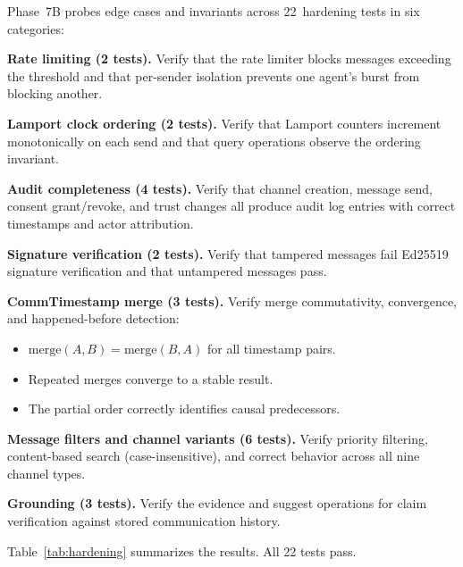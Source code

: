 \documentclass[10pt, twocolumn]{article}
\begin{document}
Phase~7B probes edge cases and invariants across 22~hardening tests in six categories:

\textbf{Rate limiting (2 tests).} Verify that the rate limiter blocks messages exceeding the threshold and that per-sender isolation prevents one agent's burst from blocking another.

\textbf{Lamport clock ordering (2 tests).} Verify that Lamport counters increment monotonically on each send and that query operations observe the ordering invariant.

\textbf{Audit completeness (4 tests).} Verify that channel creation, message send, consent grant/revoke, and trust changes all produce audit log entries with correct timestamps and actor attribution.

\textbf{Signature verification (2 tests).} Verify that tampered messages fail Ed25519 signature verification and that untampered messages pass.

\textbf{CommTimestamp merge (3 tests).} Verify merge commutativity, convergence, and happened-before detection:
\begin{itemize}[nosep, leftmargin=*]
  \item $\text{merge}(A, B) = \text{merge}(B, A)$ for all timestamp pairs.
  \item Repeated merges converge to a stable result.
  \item The partial order correctly identifies causal predecessors.
\end{itemize}

\textbf{Message filters and channel variants (6 tests).} Verify priority filtering, content-based search (case-insensitive), and correct behavior across all nine channel types.

\textbf{Grounding (3 tests).} Verify the evidence and suggest operations for claim verification against stored communication history.

Table~\ref{tab:hardening} summarizes the results. All 22 tests pass.
\end{document}

